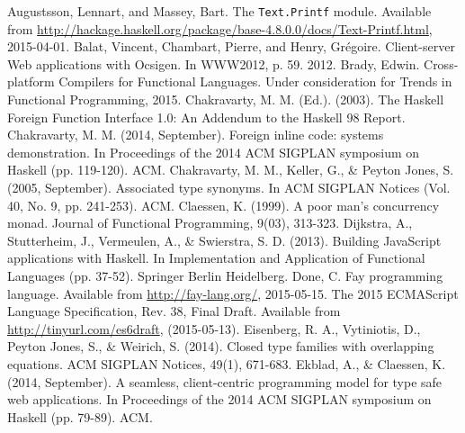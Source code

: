 \documentclass[preprint]{sigplanconf}
\begin{document}

\begin{thebibliography}{}
\softraggedright

  Augustsson, Lennart, and Massey, Bart. The {\tt Text.Printf} module.
  Available from \url{http://hackage.haskell.org/package/base-4.8.0.0/docs/Text-Printf.html},
  2015-04-01.
  Balat, Vincent, Chambart, Pierre, and Henry, Grégoire.
  Client-server Web applications with Ocsigen.
  In WWW2012, p. 59. 2012.
  Brady, Edwin.
  Cross-platform Compilers for Functional Languages.
  Under consideration for Trends in Functional Programming, 2015.
  Chakravarty, M. M. (Ed.). (2003).
  The Haskell Foreign Function Interface 1.0: An Addendum to the Haskell 98
  Report.
  Chakravarty, M. M. (2014, September).
  Foreign inline code: systems demonstration.
  In Proceedings of the 2014 ACM SIGPLAN symposium on Haskell (pp. 119-120).
  ACM.
  Chakravarty, M. M., Keller, G., \& Peyton Jones, S. (2005, September).
  Associated type synonyms.
  In ACM SIGPLAN Notices (Vol. 40, No. 9, pp. 241-253). ACM.
  Claessen, K. (1999).
  A poor man's concurrency monad.
  Journal of Functional Programming, 9(03), 313-323.
  Dijkstra, A., Stutterheim, J., Vermeulen, A., \& Swierstra, S. D. (2013).
  Building JavaScript applications with Haskell.
  In Implementation and Application of Functional Languages (pp. 37-52).
  Springer Berlin Heidelberg.
  Done, C.
  Fay programming language.
  Available from \url{http://fay-lang.org/}, 2015-05-15.
  The 2015 ECMAScript Language Specification, Rev. 38, Final Draft.
  Available from \url{http://tinyurl.com/es6draft},
  (2015-05-13).
  Eisenberg, R. A., Vytiniotis, D., Peyton Jones, S., \& Weirich, S. (2014).
  Closed type families with overlapping equations.
  ACM SIGPLAN Notices, 49(1), 671-683.
  Ekblad, A., \& Claessen, K. (2014, September).
  A seamless, client-centric programming model for type safe web applications.
  In Proceedings of the 2014 ACM SIGPLAN symposium on Haskell (pp. 79-89). ACM.

\end{thebibliography}
\end{document}
